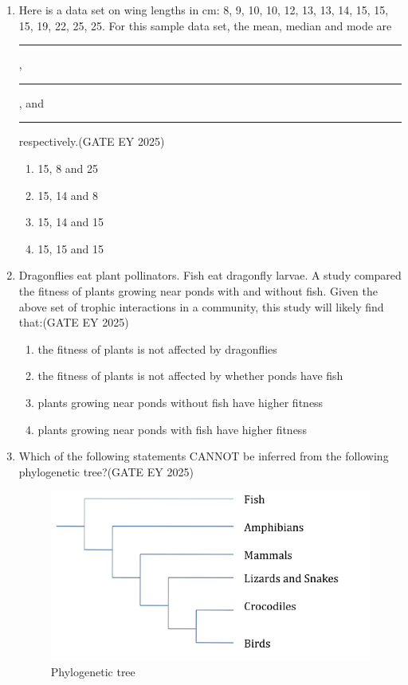 \begin{enumerate}[leftmargin=*,label=\textbf{Q.\arabic*},resume]

\item Here is a data set on wing lengths in cm: 8, 9, 10, 10, 12, 13, 13, 14, 15, 15, 15, 19, 22, 25, 25. For this sample data set, the mean, median and mode are \rule{3cm}{0.15mm}, \rule{3cm}{0.15mm}, and \rule{3cm}{0.15mm} respectively.\hfill {(GATE EY 2025)}
\begin{multicols}{2}
\begin{enumerate}
\item 15, 8 and 25
\item 15, 14 and 8
\item 15, 14 and 15
\item 15, 15 and 15
\end{enumerate}
\end{multicols}

\item Dragonflies eat plant pollinators. Fish eat dragonfly larvae. A study compared the fitness of plants growing near ponds with and without fish. Given the above set of trophic interactions in a community, this study will likely find that:\hfill {(GATE EY 2025)}
\begin{multicols}{2}
\begin{enumerate}
\item the fitness of plants is not affected by dragonflies
\item the fitness of plants is not affected by whether ponds have fish
\item plants growing near ponds without fish have higher fitness
\item plants growing near ponds with fish have higher fitness
\end{enumerate}
\end{multicols}

\item Which of the following statements CANNOT be inferred from the following phylogenetic tree?\hfill {(GATE EY 2025)}

\begin{figure}[H]
    \centering
    \includegraphics[width=0.9\columnwidth]{figs/imageQ28.png}
    \caption{Phylogenetic tree}
    \label{fig:q28-phylogeny}
\end{figure}


\end{enumerate}

